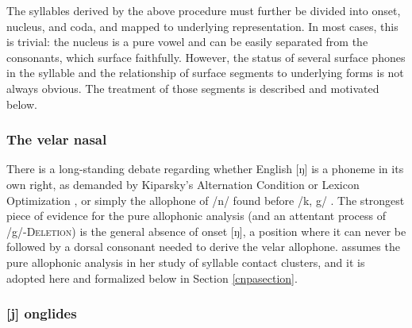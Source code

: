 
The syllables derived by the above procedure must further be divided into onset, nucleus, and coda, and mapped to underlying representation. In most cases, this is trivial: the nucleus is a pure vowel and can be easily separated from the consonants, which surface faithfully. However, the status of several surface phones in the syllable and the relationship of surface segments to underlying forms is not always obvious. The treatment of those segments is described and motivated below. 

\subsubsection{The velar nasal}
\label{velarnasal}

There is a long-standing debate regarding whether English [ŋ] is a phoneme in its own right, as demanded by Kiparsky's Alternation Condition \citep{Kiparsky1968} or Lexicon Optimization \citep[][53]{OT}, or simply the allophone of /n/ found before /k, g/ \citep[][65]{Borowsky1986}. The strongest piece of evidence for the pure allophonic analysis (and an attentant process of /g/-\textsc{Deletion}) is the general absence of onset [ŋ], a position where it can never be followed by a dorsal consonant needed to derive the velar allophone. \citet{Pierrehumbert1994} assumes the pure allophonic analysis in her study of syllable contact clusters, and it is adopted here and formalized below in Section \ref{cnpasection}.

\subsubsection{[j] onglides}

